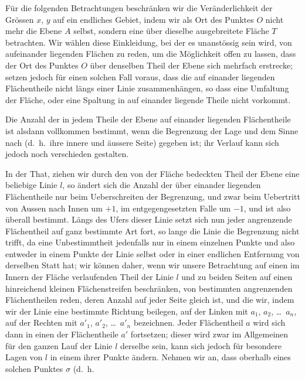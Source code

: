 \documentclass{article}
\begin{document}
Für die folgenden Betrachtungen beschränken wir die Veränderlichkeit der Grössen $x$, $y$ auf ein endliches Gebiet, indem wir als Ort des Punktes $O$ nicht mehr die Ebene $A$ selbst, sondern eine über dieselbe ausgebreitete Fläche $T$ betrachten. Wir wählen diese Einkleidung, bei der es unanstössig sein wird, von aufeinander liegenden Flächen zu reden, um die Möglichkeit offen zu lassen, dass der Ort des Punktes $O$ über denselben Theil der Ebene sich mehrfach erstrecke; setzen jedoch für einen solchen Fall voraus, dass die auf einander liegenden Flächentheile nicht längs einer Linie zusammenhängen, so dass eine Umfaltung der Fläche, oder eine Spaltung in auf einander liegende Theile nicht vorkommt.

Die Anzahl der in jedem Theile der Ebene auf einander liegenden Flächentheile ist alsdann vollkommen bestimmt, wenn die Begrenzung der Lage und dem Sinne nach (d.\ h.\ ihre innere und äussere Seite) gegeben ist; ihr Verlauf kann sich jedoch noch verschieden gestalten.

In der That, ziehen wir durch den von der Fläche bedeckten Theil der Ebene eine beliebige Linie $l$, so ändert sich die Anzahl der über einander liegenden Flächentheile nur beim Ueberschreiten der Begrenzung, und zwar beim Uebertritt von Aussen nach Innen um $+1$, im entgegengesetzten Falle um $-1$, und ist also überall bestimmt. Längs des Ufers dieser Linie setzt sich nun jeder angrenzende Flächentheil auf ganz bestimmte Art fort, so lange die Linie die Begrenzung nicht trifft, da eine Unbestimmtheit jedenfalls nur in einem einzelnen Punkte und also entweder in einem Punkte der Linie selbst oder in einer endlichen Entfernung von derselben Statt hat; wir können daher, wenn wir unsere Betrachtung auf einen im Innern der Fläche verlaufenden Theil der Linie $l$ und zu beiden Seiten auf einen hinreichend kleinen Flächenstreifen beschränken, von bestimmten angrenzenden Flächentheilen reden, deren Anzahl auf jeder Seite gleich ist, und die wir, indem wir der Linie eine bestimmte Richtung beilegen, auf der Linken mit $a_1$, $a_2$, \dots\ $a_n$, auf der Rechten mit $a'_1$, $a'_2$, \dots\ $a'_n$ bezeichnen. Jeder Flächentheil $a$ wird sich dann in einen der Flächentheile $a'$ fortsetzen; dieser wird zwar im Allgemeinen für den ganzen Lauf der Linie $l$ derselbe sein, kann sich jedoch für besondere Lagen von $l$ in einem ihrer Punkte ändern. Nehmen wir an, dass oberhalb eines solchen Punktes $\sigma$ (d.\ h.
\end{document}
